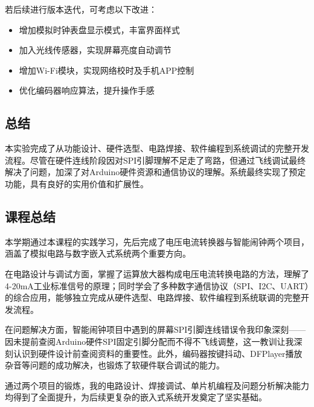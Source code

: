\documentclass[12pt,a4paper]{article}
\begin{document}
若后续进行版本迭代，可考虑以下改进：
\begin{itemize}
    \item 增加模拟时钟表盘显示模式，丰富界面样式
    \item 加入光线传感器，实现屏幕亮度自动调节
    \item 增加Wi-Fi模块，实现网络校时及手机APP控制
    \item 优化编码器响应算法，提升操作手感
\end{itemize}

\subsection*{总结}

本实验完成了从功能设计、硬件选型、电路焊接、软件编程到系统调试的完整开发流程。尽管在硬件连线阶段因对SPI引脚理解不足走了弯路，但通过飞线调试最终解决了问题，加深了对Arduino硬件资源和通信协议的理解。系统最终实现了预定功能，具有良好的实用价值和扩展性。

\subsection*{课程总结}

本学期通过本课程的实践学习，先后完成了电压电流转换器与智能闹钟两个项目，涵盖了模拟电路与数字嵌入式系统两个重要方向。

在电路设计与调试方面，掌握了运算放大器构成电压电流转换电路的方法，理解了4-20mA工业标准信号的原理；同时学会了多种数字通信协议（SPI、I2C、UART）的综合应用，能够独立完成从硬件选型、电路焊接、软件编程到系统联调的完整开发流程。

在问题解决方面，智能闹钟项目中遇到的屏幕SPI引脚连线错误令我印象深刻——因未提前查阅Arduino硬件SPI固定引脚分配而不得不飞线调整，这一教训让我深刻认识到硬件设计前查阅资料的重要性。此外，编码器按键抖动、DFPlayer播放杂音等问题的成功解决，也锻炼了软硬件联合调试的能力。

通过两个项目的锻炼，我的电路设计、焊接调试、单片机编程及问题分析解决能力均得到了全面提升，为后续更复杂的嵌入式系统开发奠定了坚实基础。
\end{document}
